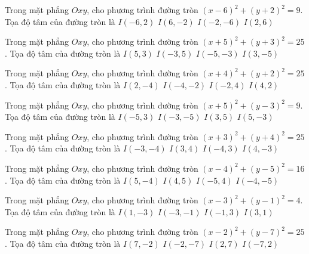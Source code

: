 \begin{ex}
Trong mặt phẳng $Oxy$, cho phương trình đường tròn $(x -6)^2   + (y + 2)^2 = 9$. Tọa độ tâm của đường tròn là
\choice
{ $I(-6, 2)$ }
{ \True $I(6, -2)$ }
{ $I(-2, -6)$ }
{ $I(2, 6)$ }
\end{ex}

\begin{ex}
Trong mặt phẳng $Oxy$, cho phương trình đường tròn $(x + 5)^2  + (y + 3)^2 = 25$. Tọa độ tâm của đường tròn là
\choice
{ $I(5, 3)$ }
{ $I(-3, 5)$ }
{ \True $I(-5, -3)$ }
{ $I(3, -5)$ }
\end{ex}

\begin{ex}
Trong mặt phẳng $Oxy$, cho phương trình đường tròn $(x + 4)^2  + (y + 2)^2 = 25$. Tọa độ tâm của đường tròn là
\choice
{ $I(2, -4)$ }
{ \True $I(-4, -2)$ }
{ $I(-2, 4)$ }
{ $I(4, 2)$ }
\end{ex}

\begin{ex}
Trong mặt phẳng $Oxy$, cho phương trình đường tròn $(x + 5)^2  + (y -3)^2 = 9$. Tọa độ tâm của đường tròn là
\choice
{ \True $I(-5, 3)$ }
{ $I(-3, -5)$ }
{ $I(3, 5)$ }
{ $I(5, -3)$ }
\end{ex}

\begin{ex}
Trong mặt phẳng $Oxy$, cho phương trình đường tròn $(x + 3)^2  + (y + 4)^2 = 25$. Tọa độ tâm của đường tròn là
\choice
{ \True $I(-3, -4)$ }
{ $I(3, 4)$ }
{ $I(-4, 3)$ }
{ $I(4, -3)$ }
\end{ex}

\begin{ex}
Trong mặt phẳng $Oxy$, cho phương trình đường tròn $(x -4)^2   + (y -5)^2 = 16$. Tọa độ tâm của đường tròn là
\choice
{ $I(5, -4)$ }
{ \True $I(4, 5)$ }
{ $I(-5, 4)$ }
{ $I(-4, -5)$ }
\end{ex}

\begin{ex}
Trong mặt phẳng $Oxy$, cho phương trình đường tròn $(x -3)^2   + (y -1)^2 = 4$. Tọa độ tâm của đường tròn là
\choice
{ $I(1, -3)$ }
{ $I(-3, -1)$ }
{ $I(-1, 3)$ }
{ \True $I(3, 1)$ }
\end{ex}

\begin{ex}
Trong mặt phẳng $Oxy$, cho phương trình đường tròn $(x -2)^2   + (y -7)^2 = 25$. Tọa độ tâm của đường tròn là
\choice
{ $I(7, -2)$ }
{ $I(-2, -7)$ }
{ \True $I(2, 7)$ }
{ $I(-7, 2)$ }
\end{ex}

